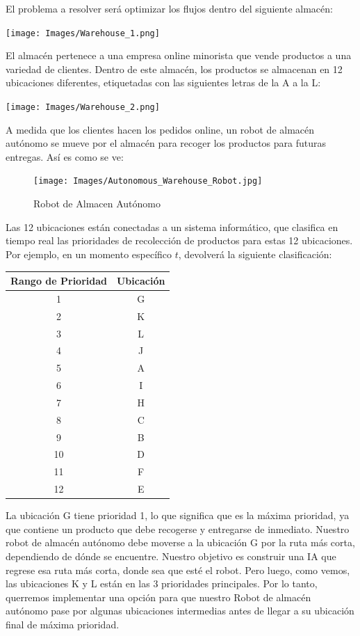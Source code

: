 \documentclass[
]{book}
\begin{document}
El problema a resolver será optimizar los flujos dentro del siguiente almacén:

\texttt{[image: Images/Warehouse\_1.png]}

El almacén pertenece a una empresa online minorista que vende productos a una variedad de clientes. Dentro de este almacén, los productos se almacenan en 12 ubicaciones diferentes, etiquetadas con las siguientes letras de la A a la L:

\texttt{[image: Images/Warehouse\_2.png]}

A medida que los clientes hacen los pedidos online, un robot de almacén autónomo se mueve por el almacén para recoger los productos para futuras entregas. Así es como se ve:

\begin{figure}
\centering
\texttt{[image: Images/Autonomous\_Warehouse\_Robot.jpg]}
\caption{Robot de Almacen Autónomo}
\end{figure}

Las 12 ubicaciones están conectadas a un sistema informático, que clasifica en tiempo real las prioridades de recolección de productos para estas 12 ubicaciones. Por ejemplo, en un momento específico \(t\), devolverá la siguiente clasificación:

\begin{longtable}[]{@{}cc@{}}
\toprule()
\textbf{Rango de Prioridad} & \textbf{Ubicación} \\
\midrule()
\endhead
1 & G \\
2 & K \\
3 & L \\
4 & J \\
5 & A \\
6 & I \\
7 & H \\
8 & C \\
9 & B \\
10 & D \\
11 & F \\
12 & E \\
\bottomrule()
\end{longtable}

La ubicación G tiene prioridad 1, lo que significa que es la máxima prioridad, ya que contiene un producto que debe recogerse y entregarse de inmediato. Nuestro robot de almacén autónomo debe moverse a la ubicación G por la ruta más corta, dependiendo de dónde se encuentre. Nuestro objetivo es construir una IA que regrese esa ruta más corta, donde sea que esté el robot. Pero luego, como vemos, las ubicaciones K y L están en las 3 prioridades principales. Por lo tanto, querremos implementar una opción para que nuestro Robot de almacén autónomo pase por algunas ubicaciones intermedias antes de llegar a su ubicación final de máxima prioridad.
\end{document}
